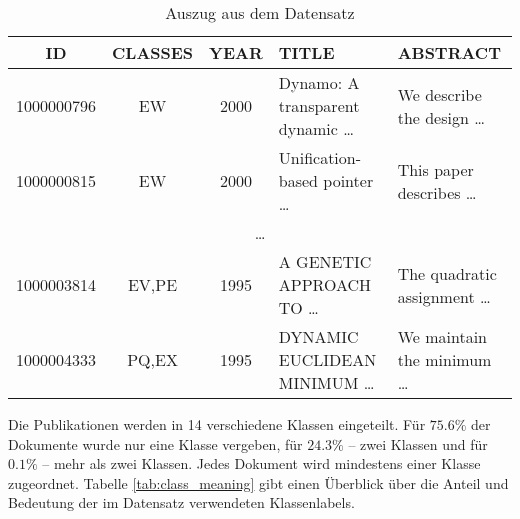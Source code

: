 \begin{table}[h]
    \begin{tabular}{cccll}
        \tiny\textbf{ID} &\tiny \textbf{CLASSES} &\tiny \textbf{YEAR} &\tiny \textbf{TITLE} & \tiny \textbf{ABSTRACT} \\
        \hline
        \tiny 1000000796 &\tiny EW & \tiny 2000 & \tiny Dynamo: A transparent dynamic \dots  & \tiny We describe the design \dots \\
        \tiny 1000000815 &\tiny EW & \tiny 2000 & \tiny Unification-based pointer \dots  & \tiny This paper describes \dots \\
        \multicolumn{5}{c}{\dots} \\
        \tiny 1000003814 &\tiny EV,PE & \tiny 1995 & \tiny A GENETIC APPROACH TO \dots  & \tiny The quadratic assignment \dots \\
        \tiny 1000004333 & \tiny PQ,EX &\tiny 1995 &\tiny DYNAMIC EUCLIDEAN MINIMUM \dots & \tiny We maintain the minimum \dots \\
    \end{tabular}
    \caption{Auszug aus dem Datensatz}
    \label{tab:data}
\end{table}


Die Publikationen werden in 14 verschiedene Klassen eingeteilt.
Für $75.6 \%$ der Dokumente wurde nur eine Klasse vergeben, für $24.3 \%$ -- zwei Klassen und für $0.1 \%$ -- mehr als zwei Klassen.
Jedes Dokument wird mindestens einer Klasse zugeordnet.
Tabelle \ref{tab:class_meaning} gibt einen Überblick über die Anteil und Bedeutung der im Datensatz verwendeten Klassenlabels.



